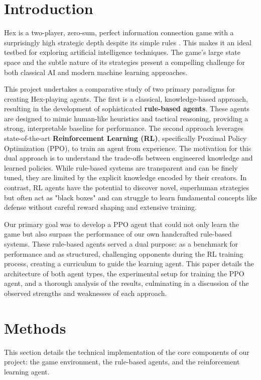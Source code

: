 \documentclass[conference]{IEEEtran}
\begin{document}
\section{Introduction}
Hex is a two-player, zero-sum, perfect information connection game with a surprisingly high strategic depth despite its simple rules \cite{b1}. This makes it an ideal testbed for exploring artificial intelligence techniques. The game's large state space and the subtle nature of its strategies present a compelling challenge for both classical AI and modern machine learning approaches.

This project undertakes a comparative study of two primary paradigms for creating Hex-playing agents. The first is a classical, knowledge-based approach, resulting in the development of sophisticated \textbf{rule-based agents}. These agents are designed to mimic human-like heuristics and tactical reasoning, providing a strong, interpretable baseline for performance. The second approach leverages state-of-the-art \textbf{Reinforcement Learning (RL)}, specifically Proximal Policy Optimization (PPO), to train an agent from experience. The motivation for this dual approach is to understand the trade-offs between engineered knowledge and learned policies. While rule-based systems are transparent and can be finely tuned, they are limited by the explicit knowledge encoded by their creators. In contrast, RL agents have the potential to discover novel, superhuman strategies but often act as "black boxes" and can struggle to learn fundamental concepts like defense without careful reward shaping and extensive training.

Our primary goal was to develop a PPO agent that could not only learn the game but also surpass the performance of our own handcrafted rule-based systems. These rule-based agents served a dual purpose: as a benchmark for performance and as structured, challenging opponents during the RL training process, creating a curriculum to guide the learning agent. This paper details the architecture of both agent types, the experimental setup for training the PPO agent, and a thorough analysis of the results, culminating in a discussion of the observed strengths and weaknesses of each approach.

\section{Methods}
This section details the technical implementation of the core components of our project: the game environment, the rule-based agents, and the reinforcement learning agent.
\end{document}
